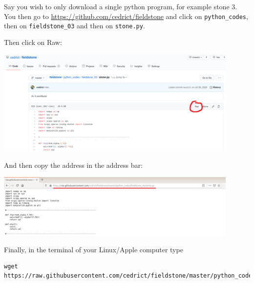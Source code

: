 
Say you wish to only download a single python program, for example stone 3. You then go to 
\url{https://github.com/cedrict/fieldstone} and click on {\tt python\_codes}, then on {\tt fieldstone\_03} and
then on {\tt stone.py}.

Then click on Raw:

\begin{center}
\includegraphics[width=12cm]{images/wget1} 
\end{center}

And then copy the address in the address bar:

\begin{center}
\includegraphics[width=12cm]{images/wget2} 
\end{center}

Finally, in the terminal of your Linux/Apple computer type

\begin{verbatim}
wget https://raw.githubusercontent.com/cedrict/fieldstone/master/python_codes/fieldstone_03/stone.py
\end{verbatim}
